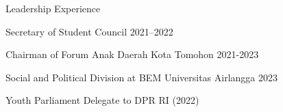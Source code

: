 \documentclass{article}
\newlength{\tabin}
\newlength{\secsep}
\newcommand{\lineunder}{\vspace*{-8pt} \\ \hspace*{-6pt} \hrulefill \\ \vspace*{-15pt}}
\newenvironment{tabbedsection}[1]{
  \begin{list}{}{
      \setlength{\itemsep}{0pt}
      \setlength{\labelsep}{0pt}
      \setlength{\labelwidth}{0pt}
      \setlength{\leftmargin}{\tabin}
      \setlength{\rightmargin}{\tabin}
      \setlength{\listparindent}{0pt}
      \setlength{\parsep}{0pt}
      \setlength{\parskip}{0pt}
      \setlength{\partopsep}{0pt}
      \setlength{\topsep}{#1}
    }
  \item[]
}{\end{list}}
\newenvironment{resume_section}[1]{
  \filbreak
  \vspace{2\secsep}
  \textsc{\large#1}
  \lineunder
  \begin{tabbedsection}{\secsep}
}{\end{tabbedsection}}
\newenvironment{subitems}{
  \renewcommand{\labelitemi}{-}
  \begin{itemize}
      \setlength{\labelsep}{1em}
}{\end{itemize}}
\newenvironment{resume_employer_simple}[2]{
  \vspace{\secsep}
  \textbf{#1} \\ 
  \indent {\small #2}
  \begin{tabbedsection}{0pt}
  \begin{subitems}
}{\end{subitems}\end{tabbedsection}}
\begin{document}
\begin{resume_section}{Leadership Experience}

  \begin{resume_employer_simple}{Secretary of Student Council 2021--2022}{}{}{}
\vspace{-\baselineskip}
  \end{resume_employer_simple}
    \vspace{-\baselineskip}
      \begin{resume_employer_simple}{Chairman of Forum Anak Daerah Kota Tomohon 2021-2023}{}{}{}
      \vspace{-\baselineskip}
  \end{resume_employer_simple}
  \vspace{-\baselineskip}
    \begin{resume_employer_simple}{Social and Political Division at BEM Universitas Airlangga 2023}{}{}{}
          \vspace{-\baselineskip}

  \end{resume_employer_simple}
      \vspace{-\baselineskip}
      \begin{resume_employer_simple}{Youth Parliament Delegate to DPR RI (2022)}{}{}{}
      \vspace{-\baselineskip}
  \end{resume_employer_simple}
  
\end{resume_section}
\end{document}
